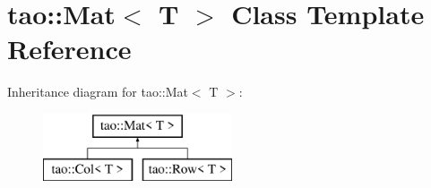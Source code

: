 \hypertarget{classtao_1_1_mat}{}\section{tao\+::Mat$<$ T $>$ Class Template Reference}
\label{classtao_1_1_mat}
Inheritance diagram for tao\+::Mat$<$ T $>$\+:\begin{figure}[H]
\begin{center}
\leavevmode
\includegraphics[height=2.000000cm]{classtao_1_1_mat}
\end{center}
\end{figure}
